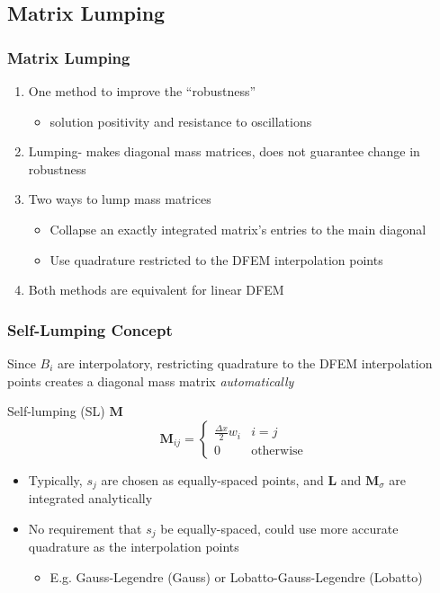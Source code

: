 \documentclass{beamer}
\newcommand{\be}{\begin{equation*}}   %
\newcommand{\ee}{\end{equation*}}
\newcommand{\B}[1]{\ensuremath{B_{#1} }}			%
\begin{document}
\subsection{Matrix Lumping}
\begin{frame}
\frametitle{Matrix Lumping}

\begin{enumerate}
\item One method to improve the ``robustness'' 
\begin{itemize} 
\item solution positivity and resistance to oscillations
\end{itemize}
\item Lumping- makes diagonal mass matrices, does not guarantee change in robustness
\item Two ways to lump mass matrices
\begin{itemize}
\item Collapse an exactly integrated matrix's entries to the main diagonal
\item Use quadrature restricted to the DFEM interpolation points
\end{itemize} 
\item Both methods are equivalent for linear DFEM
\end{enumerate}

\end{frame}
%
%
%

\begin{frame}
\frametitle{Self-Lumping Concept}
Since $\B{i}$ are interpolatory, restricting quadrature to the DFEM interpolation points creates a diagonal mass matrix  {\em automatically}
\begin{block}{Self-lumping (SL) $\mathbf{M}$}
\be
\mathbf{M}_{ij} = \left \{ \begin{array}{ll}  \frac{\Delta x }{2} w_i  & i=j \\ 0 & \text{otherwise} \end{array} \right.
\ee
\end{block}
\begin{itemize}
\item Typically, $s_j$ are chosen as equally-spaced points, and $\mathbf{L}$ and $\mathbf{M}_{\sigma}$ are integrated analytically
\item No requirement that $s_j$ be equally-spaced, could use more accurate quadrature as the interpolation points
\begin{itemize}
\item E.g. Gauss-Legendre (Gauss) or Lobatto-Gauss-Legendre (Lobatto)
\end{itemize}
\end{itemize}
\end{frame}
\end{document}
